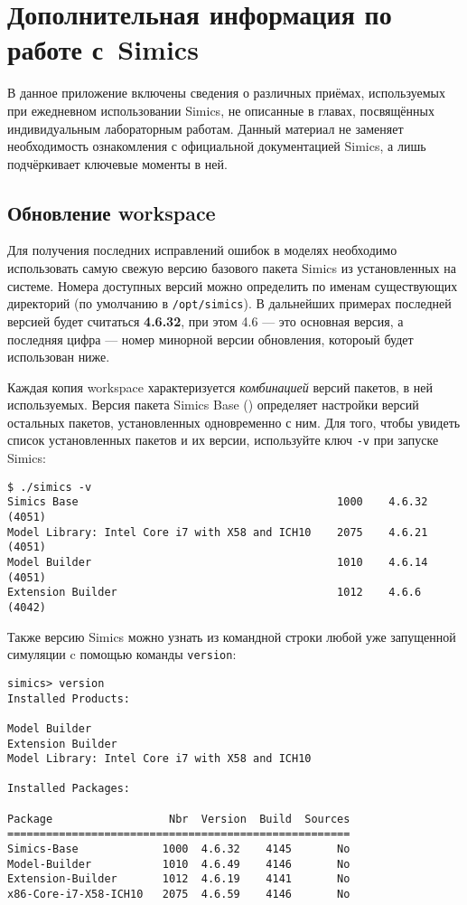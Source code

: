 \chapter{Дополнительная информация по работе с~Simics} \label{chap:append01}

В данное приложение включены сведения о различных приёмах, используемых при ежедневном использовании Simics, не описанные в главах, посвящённых индивидуальным лабораторным работам. Данный материал не заменяет необходимость ознакомления с официальной документацией Simics, а лишь подчёркивает ключевые моменты в ней.

\section{Обновление workspace}

Для получения последних исправлений ошибок в моделях необходимо использовать самую свежую версию базового пакета Simics из  установленных на системе. Номера доступных версий можно определить по именам существующих директорий (по умолчанию в \texttt{/opt/simics}). В дальнейших примерах последней версией будет считаться \textbf{4.6.32}, при этом 4.6 --- это основная версия, а последняя цифра --- номер минорной версии обновления, котороый будет использован ниже.

Каждая копия workspace характеризуется \emph{комбинацией} версий пакетов, в ней используемых. Версия пакета Simics Base () определяет настройки версий остальных пакетов, установленных одновременно с ним. Для того, чтобы увидеть список установленных пакетов и их версии, используйте ключ \texttt{-v} при запуске Simics:

\begin{lstlisting}
$ ./simics -v
Simics Base                                        1000    4.6.32    (4051)
Model Library: Intel Core i7 with X58 and ICH10    2075    4.6.21    (4051)
Model Builder                                      1010    4.6.14    (4051)
Extension Builder                                  1012    4.6.6     (4042)
\end{lstlisting}

Также версию Simics можно узнать из командной строки любой уже запущенной симуляции c помощью команды \texttt{version}:

\begin{lstlisting}
simics> version
Installed Products:

Model Builder
Extension Builder
Model Library: Intel Core i7 with X58 and ICH10

Installed Packages:

Package                  Nbr  Version  Build  Sources
=====================================================
Simics-Base             1000  4.6.32    4145       No
Model-Builder           1010  4.6.49    4146       No
Extension-Builder       1012  4.6.19    4141       No
x86-Core-i7-X58-ICH10   2075  4.6.59    4146       No
\end{lstlisting}

